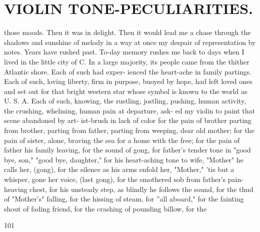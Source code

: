 \documentclass{article}
\begin{document}
\section*{VIOLIN TONE-PECULIARITIES.}
those moods. Then it was in delight. Then it would lead me a chase through the shadows and sunshine of melody in a way at once my despair of representation by notes. Years have rushed past. To-day memory rushes me back to days when I lived in the little city of C. In a large majority, its people came from the thither Atlantic shore. Each of such had exper- ienced the heart-ache in family partings. Each of such, loving liberty, firm in purpose, buoyed by hope, had left loved ones and set out for that bright western star whose symbol is known to the world as U. S. A. Each of such, knowing, the rustling, jostling, pushing, human activity, the crushing, whelming, human pain at departure, ask- ed my violin to paint that scene abandoned by art- ist-brush in lack of color for the pain of brother parting from brother, parting from father, parting from weeping, dear old mother; for the pain of sister, alone, braving the sea for a home with the free; for the pain of father his family leaving, for the sound of gong, for father's tender tone in "good bye, son," "good bye, daughter," for his heart-aching tone to wife, "Mother" he calls her, (gong), for the silence as his arms enfold her, "Mother," 'tis but a whisper, gone her voice, (last gong), for the smothered sob from father's pain-heaving chest, for his unsteady step, as blindly he follows the sound, for the thud of "Mother's" falling, for the hissing of steam, for ''all aboard," for the fainting shout of fading friend, for the crashing of pounding billow, for the

101
\end{document}
